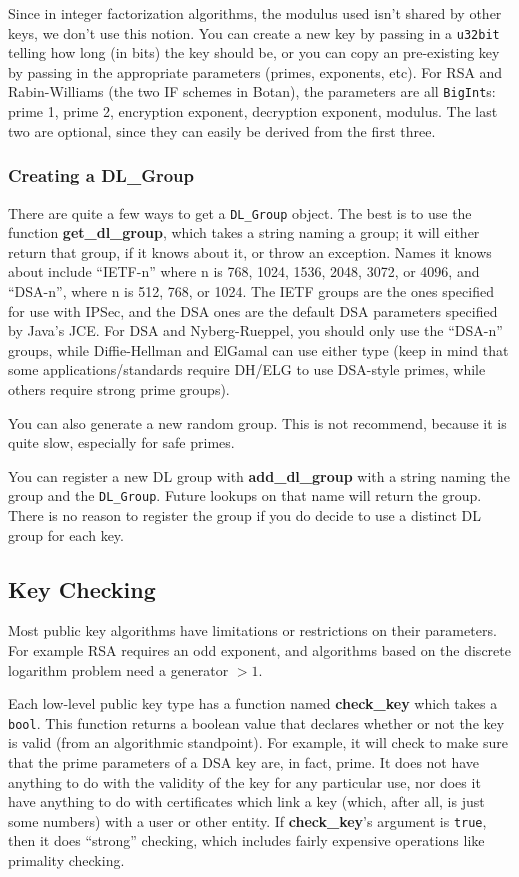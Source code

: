 \documentclass{article}
\newcommand{\function}[1]{\textbf{#1}}
\newcommand{\type}[1]{\texttt{#1}}
\begin{document}
Since in integer factorization algorithms, the modulus used isn't shared by
other keys, we don't use this notion. You can create a new key by passing in a
\type{u32bit} telling how long (in bits) the key should be, or you can copy an
pre-existing key by passing in the appropriate parameters (primes, exponents,
etc). For RSA and Rabin-Williams (the two IF schemes in Botan), the parameters
are all \type{BigInt}s: prime 1, prime 2, encryption exponent, decryption
exponent, modulus. The last two are optional, since they can easily be derived
from the first three.

\subsubsection{Creating a DL\_Group}

There are quite a few ways to get a \type{DL\_Group} object. The best is to use
the function \function{get\_dl\_group}, which takes a string naming a group; it
will either return that group, if it knows about it, or throw an
exception. Names it knows about include ``IETF-n'' where n is 768, 1024, 1536,
2048, 3072, or 4096, and ``DSA-n'', where n is 512, 768, or 1024. The IETF
groups are the ones specified for use with IPSec, and the DSA ones are the
default DSA parameters specified by Java's JCE. For DSA and Nyberg-Rueppel, you
should only use the ``DSA-n'' groups, while Diffie-Hellman and ElGamal can use
either type (keep in mind that some applications/standards require DH/ELG to
use DSA-style primes, while others require strong prime groups).

You can also generate a new random group. This is not recommend, because it is
quite slow, especially for safe primes.

You can register a new DL group with \function{add\_dl\_group} with a string
naming the group and the \type{DL\_Group}. Future lookups on that name will
return the group. There is no reason to register the group if you do decide to
use a distinct DL group for each key.

\subsection{Key Checking}

Most public key algorithms have limitations or restrictions on their
parameters. For example RSA requires an odd exponent, and algorithms based on
the discrete logarithm problem need a generator $> 1$.

Each low-level public key type has a function named \function{check\_key} which
takes a \type{bool}. This function returns a boolean value that declares
whether or not the key is valid (from an algorithmic standpoint). For example,
it will check to make sure that the prime parameters of a DSA key are, in fact,
prime. It does not have anything to do with the validity of the key for any
particular use, nor does it have anything to do with certificates which link a
key (which, after all, is just some numbers) with a user or other entity. If
\function{check\_key}'s argument is \type{true}, then it does ``strong''
checking, which includes fairly expensive operations like primality checking.
\end{document}
